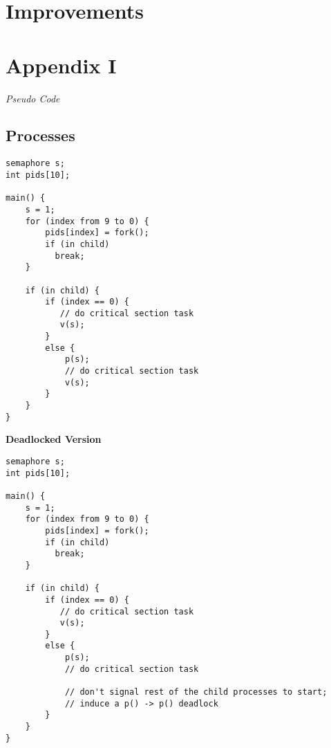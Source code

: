 \documentclass[12pt]{article}
\newcommand {\filename}[1] {\flushleft \textbf{#1}}
\newcommand {\append}[2] {\section*{Appendix #1} \textsl{\large #2}}
\begin{document}
\section*{Improvements}


\newpage
\append{I} {Pseudo Code}

\subsection*{Processes}

\begin{scriptsize}
\begin{verbatim}
semaphore s;
int pids[10];

main() {
    s = 1;
    for (index from 9 to 0) {
        pids[index] = fork();
        if (in child)
          break;
    }

    if (in child) {
        if (index == 0) {
           // do critical section task
           v(s);
        }
        else {
            p(s);
            // do critical section task
            v(s);
        }
    }
}
\end{verbatim}
\end{scriptsize}

\filename{Deadlocked Version}
\begin{scriptsize}
\begin{verbatim}
semaphore s;
int pids[10];

main() {
    s = 1;
    for (index from 9 to 0) {
        pids[index] = fork();
        if (in child)
          break;
    }

    if (in child) {
        if (index == 0) {
           // do critical section task
           v(s);
        }
        else {
            p(s);
            // do critical section task
            
            // don't signal rest of the child processes to start;
            // induce a p() -> p() deadlock
        }
    }
}
\end{verbatim}
\end{scriptsize}
\end{document}

